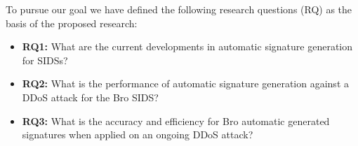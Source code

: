 


To pursue our goal we have defined the following research questions (RQ) as the basis of the proposed research:





\begin{itemize}	
	\item \textbf{RQ1:} What are the current developments in automatic signature generation for SIDSs?
	\item \textbf{RQ2:} What is the performance of automatic signature generation against a DDoS attack for the Bro SIDS?
	 \item \textbf{RQ3:} What is the accuracy and efficiency for Bro automatic generated signatures when applied on an ongoing DDoS attack?
\end{itemize}

